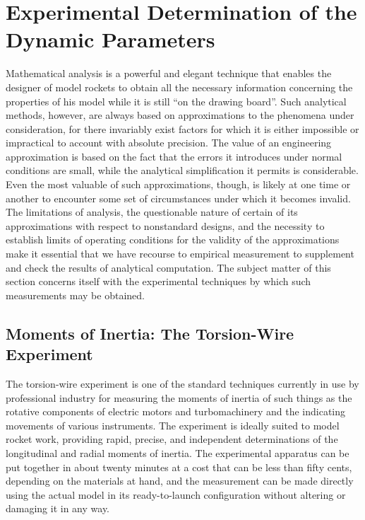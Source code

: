 \section{Experimental Determination of the Dynamic Parameters}\label{ch2:sec:5}

Mathematical analysis is a powerful and elegant technique that enables the
designer of model rockets to obtain all the necessary information concerning
the properties of his model while it is still ``on the drawing board''. Such
analytical methods, however, are always based on approximations to the
phenomena under consideration, for there invariably exist factors for which it
is either impossible or impractical to account with absolute precision. The
value of an engineering approximation is based on the fact that the errors it
introduces under normal conditions are small, while the analytical
simplification it permits is considerable. Even the most valuable of such
approximations, though, is likely at one time or another to encounter some set
of circumstances under which it becomes invalid. The limitations of analysis,
the questionable nature of certain of its approximations with respect to
nonstandard designs, and the necessity to establish limits of operating
conditions for the validity of the approximations make it essential that we
have recourse to empirical measurement to supplement and check the results of
analytical computation. The subject matter of this section concerns itself
with the experimental techniques by which such measurements may be obtained.

\subsection{Moments of Inertia: The Torsion-Wire Experiment}\label{ch2:sec:5.1}

The torsion-wire experiment is one of the standard techniques currently in use
by professional industry for measuring the moments of inertia of such things
as the rotative components of electric motors and turbomachinery and the
indicating movements of various instruments. The experiment is ideally suited
to model rocket work, providing rapid, precise, and independent determinations
of the longitudinal and radial moments of inertia. The experimental apparatus
can be put together in about twenty minutes at a cost that can be less than
fifty cents, depending on the materials at hand, and the measurement can be
made directly using the actual model in its ready-to-launch configuration
without altering or damaging it in any way.

